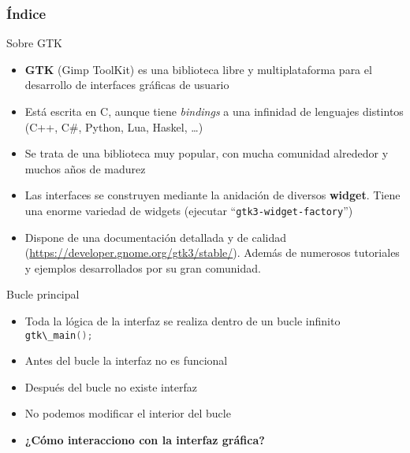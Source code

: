 \documentclass{mybeamer}
\institute{
	{\textsl{\large Tema 14}}
	\\[1em]
	\textbf{\Large GTK}
}
\begin{document}
\begin{frame}
\titlepage
\end{frame}

\begin{frame}
\frametitle{Índice}
	\tableofcontents
\end{frame}

\begin{framesec}{Sobre GTK}
	\begin{itemize}
		\item \textbf{GTK} (Gimp ToolKit) es una biblioteca libre y
			multiplataforma para el desarrollo de interfaces
			gráficas de usuario
		\item Está escrita en C, aunque tiene \textit{bindings} a una
			infinidad de lenguajes distintos (C++, C\#, Python, Lua,
			Haskel, \ldots )
		\item Se trata de una biblioteca muy popular, con mucha
			comunidad alrededor y muchos años de madurez
		\item Las interfaces se construyen mediante la anidación de
			diversos \textbf{widget}. Tiene una enorme variedad de
			widgets (ejecutar ``\texttt{gtk3-widget-factory}'')
		\item Dispone de una documentación detallada y de calidad
			(\url{https://developer.gnome.org/gtk3/stable/}). Además
			de numerosos tutoriales y ejemplos desarrollados por su
			gran comunidad.
	\end{itemize}
\end{framesec}

\begin{framesec}{Bucle principal}
	\begin{itemize}
		\item Toda la lógica de la interfaz se realiza dentro de un
			bucle infinito \lstinline[language=C]|gtk\_main();|
		\item Antes del bucle la interfaz no es funcional
		\item Después del bucle no existe interfaz
		\item No podemos modificar el interior del bucle
		\item \textbf{¿Cómo interacciono con la interfaz gráfica?}
	\end{itemize}
	
\end{framesec}
\end{document}
